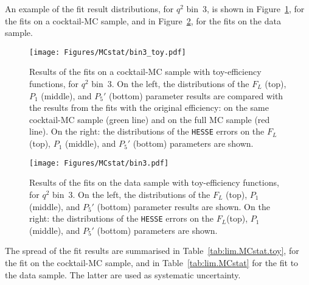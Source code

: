 An example of the fit result distributions, for $q^2$ bin~3, is shown in Figure~\ref{fig:BKG-bin3-toy}, for the fits on a cocktail-MC sample, and in Figure~\ref{fig:BKG-bin3}, for the fits on the data sample.

\begin{figure}[!hbt]
  \centering
  \texttt{[image: Figures/MCstat/bin3\_toy.pdf]}
  \caption{Results of the fits on a cocktail-MC sample with toy-efficiency functions, for $q^2$ bin~3.
    On the left, the distributions of the $F_L$ (top), $P_1$ (middle), and $P_5'$ (bottom) parameter results are compared with the results from the fits with the original efficiency: on the same cocktail-MC sample (green line) and on the full MC sample (red line).
    On the right: the distributions of the {\tt HESSE} errors on the $F_L$(top), $P_1$ (middle), and $P_5'$ (bottom) parameters are shown.}
  \label{fig:BKG-bin3-toy}
\end{figure}

\begin{figure}[!hbt]
  \centering
  \texttt{[image: Figures/MCstat/bin3.pdf]}
  \caption{Results of the fits on the data sample with toy-efficiency functions, for $q^2$ bin~3.
    On the left, the distributions of the $F_L$ (top), $P_1$ (middle), and $P_5'$ (bottom) parameter results are shown.
    On the right: the distributions of the {\tt HESSE} errors on the $F_L$(top), $P_1$ (middle), and $P_5'$ (bottom) parameters are shown.}
  \label{fig:BKG-bin3}
\end{figure}

The spread of the fit results are summarised in Table~\ref{tab:lim.MCstat.toy}, for the fit on the cocktail-MC sample, and in Table~\ref{tab:lim.MCstat} for the fit to the data sample.
The latter are used as systematic uncertainty.

